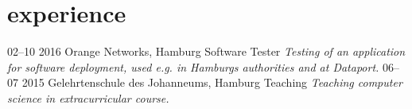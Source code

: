 \documentclass[]{friggeri-cv}
\begin{document}
\section{experience}

\begin{entrylist}
  \entry
    {02–10 2016}
    {Orange Networks, Hamburg}
    {Software Tester}
    {\emph{Testing of an application for software deployment, used e.g. in Hamburgs authorities and at Dataport.}}
  \entry
    {06–07 2015}
    {Gelehrtenschule des Johanneums, Hamburg}
    {Teaching}
    {\emph{Teaching computer science in extracurricular course.}}
\end{entrylist}

%

%

%
\end{document}
